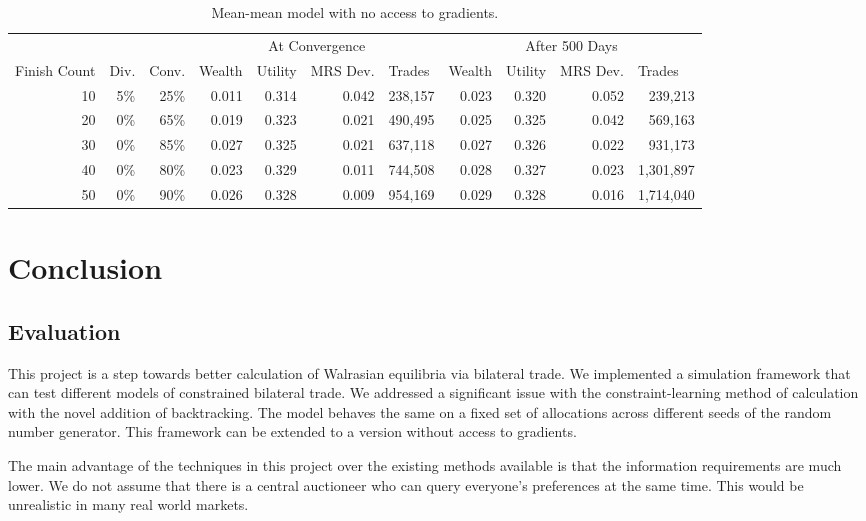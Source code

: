 \documentclass[12pt,a4paper,titlepage]{article}
\begin{document}
\begin{table}
  \begin{tabular}{r|rr|rrrr|rrrr}
    
    & \multicolumn{1}{|l}{} & \multicolumn{1}{l}{} & \multicolumn{ 4}{|c|}{At Convergence} & \multicolumn{ 4}{c}{After 500 Days} \\ 
    Finish Count & \multicolumn{1}{|l}{Div.} & \multicolumn{1}{l}{Conv.} & \multicolumn{1}{|l}{Wealth} & \multicolumn{1}{l}{Utility} & \multicolumn{1}{l}{MRS Dev.} & \multicolumn{1}{l}{Trades} & \multicolumn{1}{|l}{Wealth} & \multicolumn{1}{l}{Utility} & \multicolumn{1}{l}{MRS Dev.} & \multicolumn{1}{l}{Trades} \\ 
    \hline
    10 & 5\% & 25\% & 0.011 & 0.314 & 0.042 & 238,157 & 0.023 & 0.320 & 0.052 & 239,213 \\ 
    20 & 0\% & 65\% & 0.019 & 0.323 & 0.021 & 490,495 & 0.025 & 0.325 & 0.042 & 569,163 \\ 
    30 & 0\% & 85\% & 0.027 & 0.325 & 0.021 & 637,118 & 0.027 & 0.326 & 0.022 & 931,173 \\ 
    40 & 0\% & 80\% & 0.023 & 0.329 & 0.011 & 744,508 & 0.028 & 0.327 & 0.023 & 1,301,897 \\ 
    50 & 0\% & 90\% & 0.026 & 0.328 & 0.009 & 954,169 & 0.029 & 0.328 & 0.016 & 1,714,040 \\ 
  \end{tabular}
  \caption{Mean-mean model with no access to gradients.}
  \label{tab:ut}
\end{table}

\section{Conclusion}\label{conclusion}

\subsection{Evaluation}
This project is a step towards better calculation of Walrasian equilibria via bilateral trade.
We implemented a simulation framework that can test different models of constrained bilateral trade.
We addressed a significant issue with the constraint-learning method of calculation with the novel addition of backtracking.
The model behaves the same on a fixed set of allocations across different seeds of the random number generator.
This framework can be extended to a version without access to gradients.

The main advantage of the techniques in this project over the existing methods available is that the information requirements are much lower. 
We do not assume that there is a central auctioneer who can query everyone's preferences at the same time.
This would be unrealistic in many real world markets.
\end{document}

